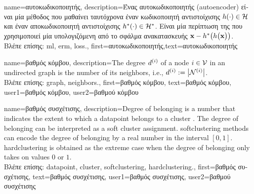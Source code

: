 {name={\foreignlanguage{greek}{αυτοκωδικοποιητής}},
	description={\foreignlanguage{greek}{Ένας αυτοκωδικοποιητής} 
	(autoencoder) \foreignlanguage{greek}{είναι μία 
	μέθοδος}  \foreignlanguage{greek}{που μαθαίνει ταυτόχρονα έναν κωδικοποιητή αντιστοίχισης} 
	$h(\cdot) \in \mathcal{H}$ \foreignlanguage{greek}{και έναν αποκωδικοποιητή αντιστοίχισης} 
	$h^{*}(\cdot) \in \mathcal{H}^{*}$. \foreignlanguage{greek}{Είναι μία περίπτωση της} 
	 \foreignlanguage{greek}{που χρησιμοποιεί μία}  \foreignlanguage{greek}{υπολογιζόμενη από το σφάλμα ανακατασκευής}
	${\bf x} - h^{*}\big(  h \big( {\bf x} \big) \big)$.\\
	\foreignlanguage{greek}{Βλέπε επίσης:} \gls{ml}, \gls{erm}, \gls{loss}.},
	first={\foreignlanguage{greek}{αυτοκωδικοποιητής}},text={\foreignlanguage{greek}{αυτοκωδικοποιητής}}
}

{name={\foreignlanguage{greek}{βαθμός κόμβου}},
	description={The degree $d^{(i)}$ of a node $i \in \mathcal{V}$ 
		in an undirected \gls{graph} is the number of its \gls{neighbors}, i.e., $d^{(i)} := \big|\mathcal{N}^{(i)}\big|$.\\
		\foreignlanguage{greek}{Βλέπε επίσης:} \gls{graph}, \gls{neighbors}.},
		first={\foreignlanguage{greek}{βαθμός κόμβου}},
		text={\foreignlanguage{greek}{βαθμός κόμβου}},
		user1={\foreignlanguage{greek}{βαθμός κόμβου}}, %
  		user2={\foreignlanguage{greek}{βαθμού κόμβου}} %
}

{name={\foreignlanguage{greek}{βαθμός συσχέτισης}},
	description={Degree of belonging is a number that indicates the extent to which a \gls{datapoint} 
		belongs to a \gls{cluster} \cite[Ch. 8]{MLBasics}. The degree of belonging can be 
		interpreted as a soft \gls{cluster} assignment. \Gls{softclustering} methods can 
		encode the degree of belonging by a real number in the interval $[0,1]$. 
		\Gls{hardclustering} is obtained as the extreme case when the degree of belonging 
		only takes on values $0$ or $1$.\\
		\foreignlanguage{greek}{Βλέπε επίσης:} \gls{datapoint}, \gls{cluster}, \gls{softclustering}, \gls{hardclustering}.}, 
		first={\foreignlanguage{greek}{βαθμός συσχέτισης}},
		text={\foreignlanguage{greek}{βαθμός συσχέτισης}},
		user1={\foreignlanguage{greek}{βαθμός συσχέτισης}}, %
    		user2={\foreignlanguage{greek}{βαθμού συσχέτισης}} %
}

